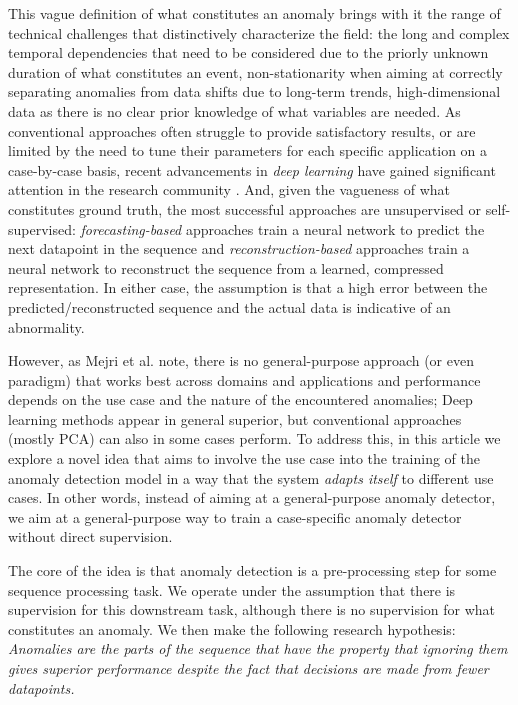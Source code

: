 \documentclass[runningheads]{llncs}
\begin{document}
This vague definition of what constitutes an anomaly brings with it
the range of technical challenges that distinctively characterize the
field: the long and complex temporal dependencies that need to be
considered due to the priorly unknown duration of what constitutes an
event, non-stationarity when aiming at correctly separating anomalies
from data shifts due to long-term trends, high-dimensional data as
there is no clear prior knowledge of what variables are needed.
As conventional approaches often struggle to provide satisfactory
results, or are limited by the need to tune their parameters for each
specific application on a case-by-case basis, recent advancements in
\emph{deep learning} have gained significant attention in the research
community \cite{MEJRI2024124922}. And, given the vagueness of what
constitutes ground truth, the most successful approaches are
unsupervised or self-supervised: \emph{forecasting-based} approaches
train a neural network to predict the next datapoint in the sequence
and \emph{reconstruction-based} approaches train a neural network to
reconstruct the sequence from a learned, compressed representation.
In either case, the assumption is that a high error between the
predicted/reconstructed sequence and the actual data is indicative of
an abnormality.

However, as Mejri et al. \cite{MEJRI2024124922} note, there is no
general-purpose approach (or even paradigm) that works best across
domains and applications and performance depends on the use case and
the nature of the encountered anomalies; Deep learning methods appear
in general superior, but conventional approaches (mostly PCA) can also
in some cases perform. To address this, in this article we explore a
novel idea that aims to involve the use case into the training of the
anomaly detection model in a way that the system \emph{adapts itself}
to different use cases. In other words, instead of aiming at a
general-purpose anomaly detector, we aim at a general-purpose way to
train a case-specific anomaly detector without direct supervision.

The core of the idea is that anomaly detection is a pre-processing
step for some sequence processing task. We operate under the
assumption that there is supervision for this downstream task,
although there is no supervision for what constitutes an anomaly.
We then make the following research hypothesis:
\emph{Anomalies are the parts of the sequence that have the property
that ignoring them gives superior performance despite the fact that
decisions are made from fewer datapoints.}
\end{document}
